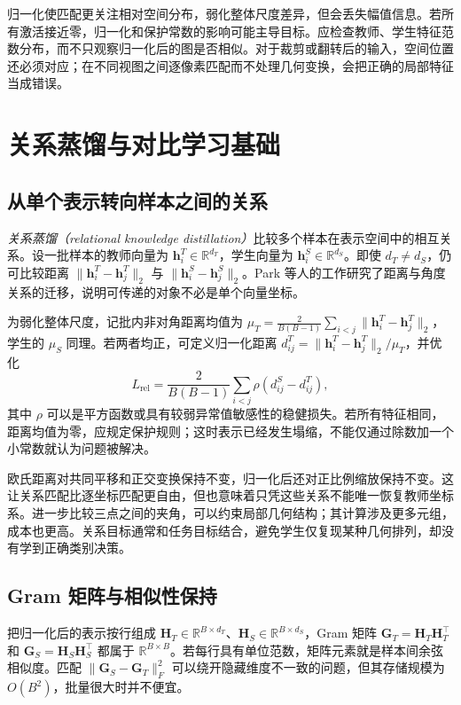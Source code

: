 \documentclass[UTF8,12pt,a4paper,fontset=fandol]{ctexart}
\begin{document}
归一化使匹配更关注相对空间分布，弱化整体尺度差异，但会丢失幅值信息。若所有激活接近零，归一化和保护常数的影响可能主导目标。应检查教师、学生特征范数分布，而不只观察归一化后的图是否相似。对于裁剪或翻转后的输入，空间位置还必须对应；在不同视图之间逐像素匹配而不处理几何变换，会把正确的局部特征当成错误。

\section{关系蒸馏与对比学习基础}
\label{sec:kd-relation}

\subsection{从单个表示转向样本之间的关系}
\emph{关系蒸馏（relational knowledge distillation）}比较多个样本在表示空间中的相互关系。设一批样本的教师向量为 $\mathbf h_i^T\in\mathbb R^{d_T}$，学生向量为 $\mathbf h_i^S\in\mathbb R^{d_S}$。即使 $d_T\ne d_S$，仍可比较距离 $\|\mathbf h_i^T-\mathbf h_j^T\|_2$ 与 $\|\mathbf h_i^S-\mathbf h_j^S\|_2$。Park 等人的工作研究了距离与角度关系的迁移\cite{park2019}，说明可传递的对象不必是单个向量坐标。

为弱化整体尺度，记批内非对角距离均值为 $\mu_T=\frac{2}{B(B-1)}\sum_{i<j}\|\mathbf h_i^T-\mathbf h_j^T\|_2$，学生的 $\mu_S$ 同理。若两者均正，可定义归一化距离 $d_{ij}^T=\|\mathbf h_i^T-\mathbf h_j^T\|_2/\mu_T$，并优化
\begin{equation}
 L_{\mathrm{rel}}=\frac{2}{B(B-1)}\sum_{i<j}
 \rho(d_{ij}^S-d_{ij}^T),
 \label{eq:kd-relation-loss}
\end{equation}
其中 $\rho$ 可以是平方函数或具有较弱异常值敏感性的稳健损失。若所有特征相同，距离均值为零，应规定保护规则；这时表示已经发生塌缩，不能仅通过除数加一个小常数就认为问题被解决。

欧氏距离对共同平移和正交变换保持不变，归一化后还对正比例缩放保持不变。这让关系匹配比逐坐标匹配更自由，但也意味着只凭这些关系不能唯一恢复教师坐标系。进一步比较三点之间的夹角，可以约束局部几何结构；其计算涉及更多元组，成本也更高。关系目标通常和任务目标结合，避免学生仅复现某种几何排列，却没有学到正确类别决策。

\subsection{Gram 矩阵与相似性保持}
把归一化后的表示按行组成 $\mathbf H_T\in\mathbb R^{B\times d_T}$、$\mathbf H_S\in\mathbb R^{B\times d_S}$，Gram 矩阵 $\mathbf G_T=\mathbf H_T\mathbf H_T^\top$ 和 $\mathbf G_S=\mathbf H_S\mathbf H_S^\top$ 都属于 $\mathbb R^{B\times B}$。若每行具有单位范数，矩阵元素就是样本间余弦相似度。匹配 $\|\mathbf G_S-\mathbf G_T\|_F^2$ 可以绕开隐藏维度不一致的问题，但其存储规模为 $O(B^2)$，批量很大时并不便宜。
\end{document}
